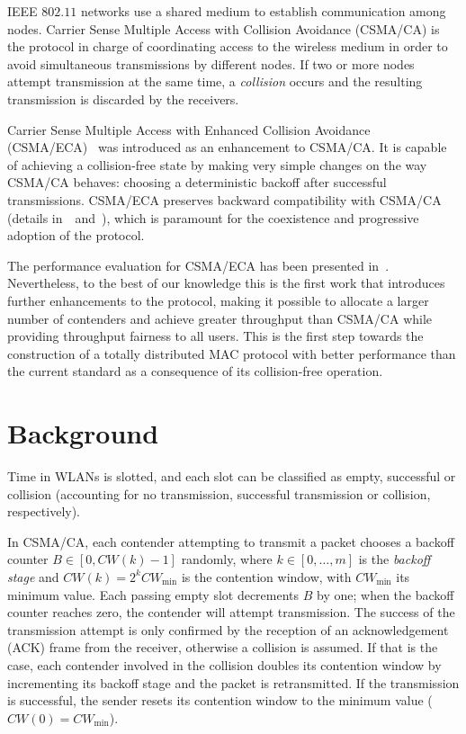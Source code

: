 IEEE $802.11$ networks use a shared medium to establish communication among nodes. Carrier Sense Multiple Access with Collision Avoidance (CSMA/CA) is the protocol in charge of coordinating access to the wireless medium in order to avoid simultaneous transmissions by different nodes. If two or more nodes attempt transmission at the same time, a \emph{collision} occurs and the resulting transmission is discarded by the receivers.

Carrier Sense Multiple Access with Enhanced Collision Avoidance (CSMA/ECA)~\cite{CSMA_ECA} was introduced as an enhancement to CSMA/CA. It is capable of achieving a collision-free state by making very simple changes on the way CSMA/CA behaves: choosing a deterministic backoff after successful transmissions. CSMA/ECA preserves backward compatibility with CSMA/CA (details in~\cite{CSMA_ECA}~and~\cite{HE}), which is paramount for the coexistence and progressive adoption of the protocol. 

The performance evaluation for CSMA/ECA has been presented in~\cite{E2CA_performance}. Nevertheless, to the best of our knowledge this is the first work that introduces further enhancements to the protocol, making it possible to allocate a larger number of contenders and achieve greater throughput than CSMA/CA while providing throughput fairness to all users. This is the first step towards the construction of a totally distributed MAC protocol with better performance than the current standard as a consequence of its collision-free operation.

\section{Background}

Time in WLANs is slotted, and each slot can be classified as empty, successful or collision (accounting for no transmission, successful transmission or collision, respectively).

In CSMA/CA, each contender attempting to transmit a packet chooses a backoff counter $B\in[0,CW(k)-1]$ randomly, where $k\in[0,\ldots,m]$ is the \emph{backoff stage} and $CW(k)=2^{k}CW_{\min}$ is the contention window, with $CW_{\min}$ its minimum value. Each passing empty slot decrements $B$ by one; when the backoff counter reaches zero, the contender will attempt transmission. The success of the transmission attempt is only confirmed by the reception of an acknowledgement (ACK) frame from the receiver, otherwise a collision is assumed. If that is the case, each contender involved in the collision doubles its contention window by incrementing its backoff stage and the packet is retransmitted. If the transmission is successful, the sender resets its contention window to the minimum value ($CW(0)=CW_{\min}$).

